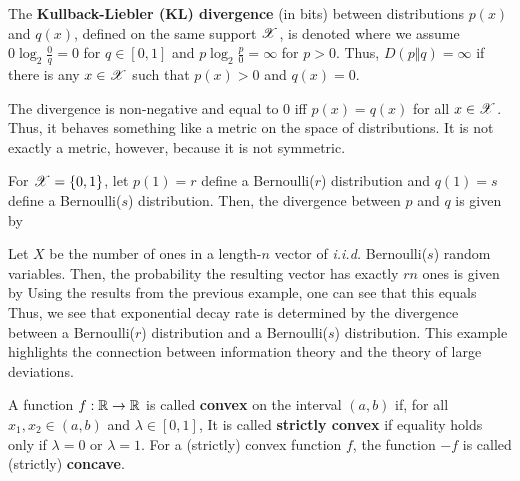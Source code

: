 \documentclass[letterpaper,10pt,english]{article}
\begin{document}
\begin{defn}
The \textbf{Kullback-Liebler (KL) divergence} (in bits) between distributions $p(x)$ and $q(x)$, 
defined on the same support $\mathscr{X}$, is denoted 
where we assume $0\log_2\frac{0}{q} = 0$ for $q \in [0,1]$ and $p\log_2\frac{p}{0} = \infty$ for $p > 0$. 
Thus, $D(p \Vert q) = \infty$ if there is any $x \in \mathscr{X}$ such that $p(x)>0$ and $q(x)=0$.
\end{defn}  
\begin{rem}
The divergence is non-negative and equal to $0$ iff $p(x) = q(x)$ for all $x \in \mathscr{X}$. 
Thus, it behaves something like a metric on the space of distributions. 
It is not exactly a metric, however, because it is not symmetric.
\end{rem}
\begin{shaded*}\begin{exmp}
For $\mathscr{X} = \left\{0,1\right\}$, let $p(1) = r$ define a Bernoulli($r$) distribution and $q(1) = s$ define a Bernoulli($s$) distribution. 
Then, the divergence between $p$ and $q$ is given by 
\end{exmp}\end{shaded*}
\begin{shaded*}\begin{exmp} 
Let $X$ be the number of ones in a length-$n$ vector of \emph{i.i.d.} Bernoulli($s$) random variables. 
Then, the probability the resulting vector has exactly $rn$ ones is given by
Using the results from the previous example, one can see that this equals
Thus, we see that exponential decay rate is determined by the divergence between a Bernoulli($r$) distribution and a Bernoulli($s$) distribution. 
This example highlights the connection between information theory and the theory of large deviations.
\end{exmp}\end{shaded*}

\begin{defn}
A function $f: \mathbb{R} \to \mathbb{R}$ is called \textbf{convex} on the interval $(a, b)$ if, for all $x_1, x_2 \in (a,b)$ and $\lambda \in [0,1]$,
It is called \textbf{strictly convex} if equality holds only if $\lambda = 0$ or $\lambda = 1$. 
For a (strictly) convex function $f$, the function $-f$ is called (strictly) \textbf{concave}. 
\end{defn} 
\end{document}
